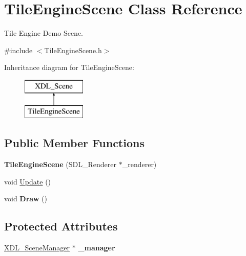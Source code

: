 \hypertarget{class_tile_engine_scene}{\section{Tile\-Engine\-Scene Class Reference}
\label{class_tile_engine_scene}
}


Tile Engine Demo Scene.  




{\ttfamily \#include $<$Tile\-Engine\-Scene.\-h$>$}

Inheritance diagram for Tile\-Engine\-Scene\-:\begin{figure}[H]
\begin{center}
\leavevmode
\includegraphics[height=2.000000cm]{class_tile_engine_scene}
\end{center}
\end{figure}
\subsection*{Public Member Functions}
\begin{DoxyCompactItemize}
\item 
\hypertarget{class_tile_engine_scene_a5dd8d770240ea26df9e0d0a83c3e963f}{{\bfseries Tile\-Engine\-Scene} (S\-D\-L\-\_\-\-Renderer $\ast$\-\_\-renderer)}\label{class_tile_engine_scene_a5dd8d770240ea26df9e0d0a83c3e963f}

\item 
void \hyperlink{class_tile_engine_scene_aabb6907efdbfb2bcfbc476f58f5dd9a8}{Update} ()
\item 
\hypertarget{class_tile_engine_scene_a34458d1b5561d9cc75af70cf4c4a6eb3}{void {\bfseries Draw} ()}\label{class_tile_engine_scene_a34458d1b5561d9cc75af70cf4c4a6eb3}

\end{DoxyCompactItemize}
\subsection*{Protected Attributes}
\begin{DoxyCompactItemize}
\item 
\hypertarget{class_tile_engine_scene_ad2949070d48fad5f0db45ecaffc6c9f1}{\hyperlink{class_x_d_l___scene_manager}{X\-D\-L\-\_\-\-Scene\-Manager} $\ast$ {\bfseries \-\_\-manager}}\label{class_tile_engine_scene_ad2949070d48fad5f0db45ecaffc6c9f1}

\end{DoxyCompactItemize}
